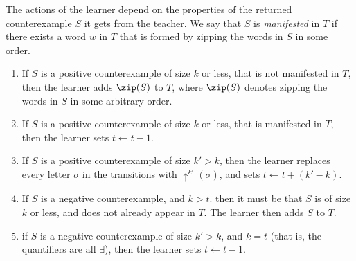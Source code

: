 The actions of the learner depend on the properties of the returned counterexample $S$ it gets from the teacher. 
We say that $S$ is {\em manifested} in $T$ if there exists a word $w$ in $T$ that is formed by zipping the words in $S$ in some order.
\begin{enumerate}
    \item 
    If $S$ is a positive counterexample of size $k$ or less, that is not manifested in $T$, then the learner adds  $\zip(S)$ to $T$, where $\zip(S)$ denotes zipping the words in $S$ in some arbitrary order. 
    \item 
    If $S$ is a positive counterexample of size $k$ or less, that is manifested in $T$, then the learner sets $t\leftarrow t-1$. 
    \item
    If $S$ is a positive counterexample of size $k'>k$, then the learner replaces every letter $\sigma$ in the transitions with $\uparrow^{k'}(\sigma)$, and sets $t\leftarrow t+(k'-k)$. 
    \item If $S$ is a negative counterexample, and $k>t$. then it must be that $S$ is of size $k$ or less, and does not already appear in $T$. The learner then adds $S$ to $T$.
    \item if $S$ is a negative counterexample of size $k'>k$, and $k=t$ (that is, the quantifiers are all $\exists$), then the learner sets $t\leftarrow t-1$.  
\end{enumerate}







